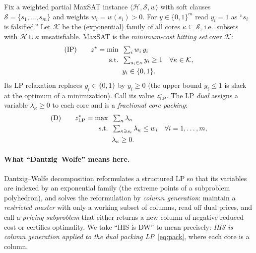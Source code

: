 \documentclass[11pt,a4paper]{article}
\begin{document}
Fix a weighted partial MaxSAT instance $\langle \mathcal{H}, \mathcal{S}, w
\rangle$ with soft clauses $\mathcal{S} = \{s_1,\dots,s_m\}$ and weights
$w_i = w(s_i) > 0$. For $y \in \{0,1\}^m$ read $y_i = 1$ as ``$s_i$ is
falsified.'' Let $\mathcal{K}$ be the (exponential) family of all cores
$\kappa \subseteq \mathcal{S}$, i.e.\ subsets with $\mathcal{H} \cup \kappa$
unsatisfiable. MaxSAT is the \emph{minimum-cost hitting set} over $\mathcal{K}$:
\begin{align}
(\mathrm{IP})\qquad
z^\star = \min \;\; & \textstyle\sum_{i} w_i\, y_i \notag\\
\text{s.t.} \;\; & \textstyle\sum_{s_i \in \kappa} y_i \ge 1 \quad \forall \kappa \in \mathcal{K}, \label{eq:hit}\\
& y_i \in \{0,1\}. \notag
\end{align}
Its LP relaxation replaces $y_i \in \{0,1\}$ by $y_i \ge 0$ (the upper bound
$y_i \le 1$ is slack at the optimum of a minimization). Call its value
$z^\star_{\mathrm{LP}}$. The LP \emph{dual} assigns a variable
$\lambda_\kappa \ge 0$ to each core and is a \emph{fractional core packing}:
\begin{align}
(\mathrm{D})\qquad
z^\star_{\mathrm{LP}} = \max \;\; & \textstyle\sum_{\kappa} \lambda_\kappa \notag\\
\text{s.t.} \;\; & \textstyle\sum_{\kappa \ni s_i} \lambda_\kappa \le w_i \quad \forall i = 1,\dots,m, \label{eq:pack}\\
& \lambda_\kappa \ge 0. \notag
\end{align}

\paragraph{What ``Dantzig--Wolfe'' means here.} Dantzig--Wolfe decomposition
reformulates a structured LP so that its variables are indexed by an exponential
family (the extreme points of a subproblem polyhedron), and solves the
reformulation by \emph{column generation}: maintain a \emph{restricted master}
with only a working subset of columns, read off dual prices, and call a
\emph{pricing subproblem} that either returns a new column of negative reduced
cost or certifies optimality. We take ``IHS is DW'' to mean precisely:
\emph{IHS is column generation applied to the dual packing LP}~\eqref{eq:pack},
where each core is a column.
\end{document}
